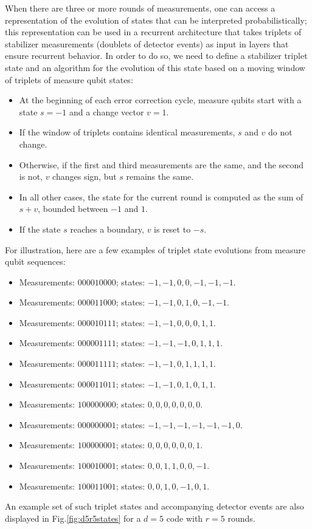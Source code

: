 When there are three or more rounds of measurements, one can access a representation of the evolution of states that can be interpreted probabilistically; this representation can be used in a recurrent architecture that takes triplets of stabilizer measurements (doublets of detector events) as input in layers that ensure recurrent behavior. In order to do so, we need to define a stabilizer triplet state and an algorithm for the evolution of this state based on a moving window of triplets of measure qubit states:
\begin{itemize}
\item At the beginning of each error correction cycle, measure qubits start with a state $s=-1$ and a change vector $v=1$.
\item If the window of triplets contains identical measurements, $s$ and $v$ do not change.
\item Otherwise, if the first and third measurements are the same, and the second is not, $v$ changes sign, but $s$ remains the same.
\item In all other cases, the state for the current round is computed as the sum of $s+v$, bounded between $-1$ and $1$.
\item If the state $s$ reaches a boundary, $v$ is reset to $-s$.
\end{itemize}

For illustration, here are a few examples of triplet state evolutions from measure qubit sequences:
\begin{itemize}
\item Measurements: $000010000$; states: $-1,-1,0,0,-1,-1,-1$.
\item Measurements: $000011000$; states: $-1,-1,0,1,0,-1,-1$.
\item Measurements: $000010111$; states: $-1,-1,0,0,0,1,1$.
\item Measurements: $000001111$; states: $-1,-1,-1,0,1,1,1$.
\item Measurements: $000011111$; states: $-1,-1,0,1,1,1,1$.
\item Measurements: $000011011$; states: $-1,-1,0,1,0,1,1$.
\item Measurements: $100000000$; states: $0,0,0,0,0,0,0$.
\item Measurements: $000000001$; states: $-1,-1,-1,-1,-1,-1,0$.
\item Measurements: $100000001$; states: $0,0,0,0,0,0,1$.
\item Measurements: $100010001$; states: $0,0,1,1,0,0,-1$.
\item Measurements: $100011001$; states: $0,0,1,0,-1,0,1$.
\end{itemize}
An example set of such triplet states and accompanying detector events are also displayed in Fig.\ref{fig:d5r5states} for a $d=5$ code with $r=5$ rounds.

